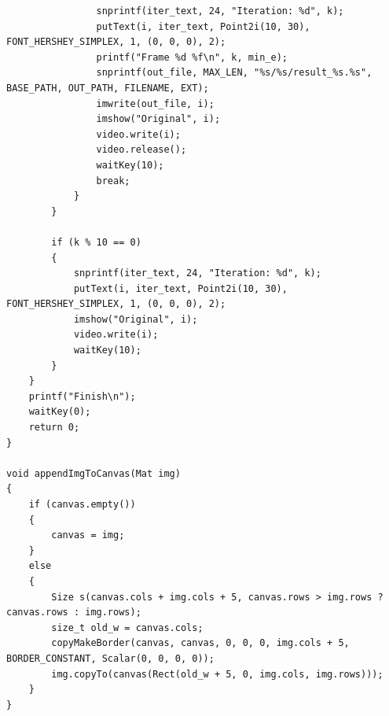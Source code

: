 \documentclass[12pt,a4paper]{report}
\begin{document}
\begin{lstlisting}
                snprintf(iter_text, 24, "Iteration: %d", k);
                putText(i, iter_text, Point2i(10, 30), FONT_HERSHEY_SIMPLEX, 1, (0, 0, 0), 2);
                printf("Frame %d %f\n", k, min_e);
                snprintf(out_file, MAX_LEN, "%s/%s/result_%s.%s", BASE_PATH, OUT_PATH, FILENAME, EXT);
                imwrite(out_file, i);
                imshow("Original", i);
                video.write(i);
                video.release();
                waitKey(10);
                break;
            }
        }

        if (k % 10 == 0)
        {
            snprintf(iter_text, 24, "Iteration: %d", k);
            putText(i, iter_text, Point2i(10, 30), FONT_HERSHEY_SIMPLEX, 1, (0, 0, 0), 2);
            imshow("Original", i);
            video.write(i);
            waitKey(10);
        }
    }
    printf("Finish\n");
    waitKey(0);
    return 0;
}

void appendImgToCanvas(Mat img)
{
    if (canvas.empty())
    {
        canvas = img;
    }
    else
    {
        Size s(canvas.cols + img.cols + 5, canvas.rows > img.rows ? canvas.rows : img.rows);
        size_t old_w = canvas.cols;
        copyMakeBorder(canvas, canvas, 0, 0, 0, img.cols + 5, BORDER_CONSTANT, Scalar(0, 0, 0, 0));
        img.copyTo(canvas(Rect(old_w + 5, 0, img.cols, img.rows)));
    }
}

\end{lstlisting}
\end{document}
